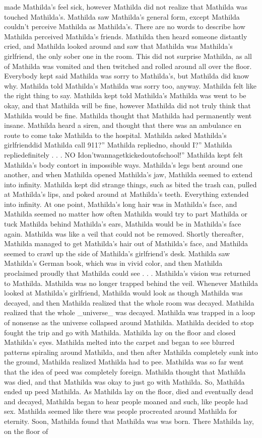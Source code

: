 \documentclass[12pt]{book}
\begin{document}
made Mathilda's feel sick, however Mathilda did not realize that Mathilda was touched Mathilda's. Mathilda saw Mathilda's general form, except Mathilda couldn't perceive Mathilda as Mathilda's. There are no words to describe how Mathilda perceived Mathilda's friends. Mathilda then heard someone distantly cried, and Mathilda looked around and saw that Mathilda was Mathilda's girlfriend, the only sober one in the room. This did not surprise Mathilda, as all of Mathilda was vomited and then twitched and rolled around all over the floor. Everybody kept said Mathilda was sorry to Mathilda's, but Mathilda did know why. Mathilda told Mathilda's Mathilda was sorry too, anyway. Mathilda felt like the right thing to say. Mathilda kept told Mathilda's Mathilda was went to be okay, and that Mathilda will be fine, however Mathilda did not truly think that Mathilda would be fine. Mathilda thought that Mathilda had permanently went insane. Mathilda heard a siren, and thought that there was an ambulance en route to come take Mathilda to the hospital. Mathilda asked Mathilda's girlfrienddid Mathilda call 911?'' Mathilda repliedno, should I?'' Mathilda repliedefinitely . . .  NO Idon'twannagetkickedoutofschool!'' Mathilda kept felt Mathilda's body contort in impossible ways. Mathilda's legs bent around one another, and when Mathilda opened Mathilda's jaw, Mathilda seemed to extend into infinity. Mathilda kept did strange things, such as bited the trash can, pulled at Mathilda's lips, and poked around at Mathilda's teeth. Everything extended into infinity. At one point, Mathilda's long hair was in Mathilda's face, and Mathilda seemed no matter how often Mathilda would try to part Mathilda or tuck Mathilda behind Mathilda's ears, Mathilda would be in Mathilda's face again. Mathilda was like a veil that could not be removed. Shortly thereafter, Mathilda managed to get Mathilda's hair out of Mathilda's face, and Mathilda seemed to crawl up the side of Mathilda's girlfriend's desk. Mathilda saw Mathilda's German book, which was in vivid color, and then Mathilda proclaimed proudly that Mathilda could see . . .  Mathilda's vision was returned to Mathilda. Mathilda was no longer trapped behind the veil. Whenever Mathilda looked at Mathilda's girlfriend, Mathilda would look as though Mathilda was decayed, and then Mathilda realized that the whole room was decayed. Mathilda realized that the whole \_universe\_ was decayed. Mathilda was trapped in a loop of nonsense as the universe collapsed around Mathilda. Mathilda decided to stop fought the trip and go with Mathilda. Mathilda lay on the floor and closed Mathilda's eyes. Mathilda melted into the carpet and began to see blurred patterns spiraling around Mathilda, and then after Mathilda completely sunk into the ground, Mathilda realized Mathilda had to pee. Mathilda was so far went that the idea of peed was completely foreign. Mathilda thought that Mathilda was died, and that Mathilda was okay to just go with Mathilda. So, Mathilda ended up peed Mathilda. As Mathilda lay on the floor, died and eventually dead and decayed, Mathilda began to hear people moaned and such, like people had sex. Mathilda seemed like there was people procreated around Mathilda for eternity. Soon, Mathilda found that Mathilda was was born. There Mathilda lay, on the floor of 
\end{document}
